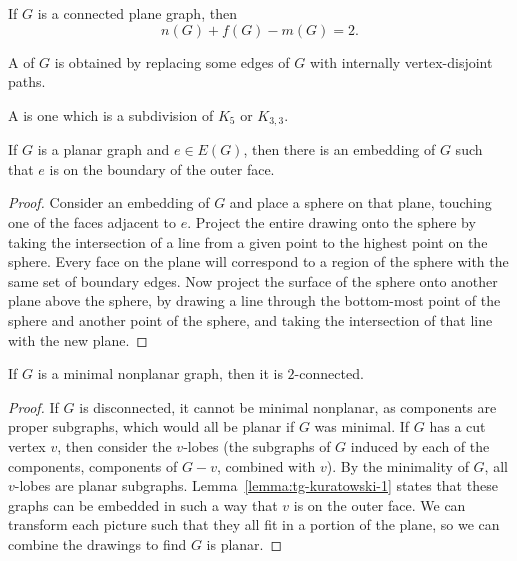 \begin{theorem}[Euler]
  If $G$ is a connected plane graph, then
  \[
	n(G) + f(G) - m(G) = 2.
  \]
\end{theorem}

\begin{definition}
  A  of $G$ is obtained by replacing some edges of $G$ with
  internally vertex-disjoint paths.
\end{definition}

\begin{definition}
  A  is one which is a subdivision of $K_5$ or
  $K_{3,3}$.
\end{definition}

\begin{lemma}
  \label{lemma:tg-kuratowski-1}
  If $G$ is a planar graph and $e \in E(G)$, then there is an embedding of $G$
  such that $e$ is on the boundary of the outer face.
\end{lemma}

\begin{proof}
  Consider an embedding of $G$ and place a sphere on that plane, touching one of
  the faces adjacent to $e$.
  Project the entire drawing onto the sphere by taking the intersection of a
  line from a given point to the highest point on the sphere.
  Every face on the plane will correspond to a region of the sphere with the
  same set of boundary edges.
  Now project the surface of the sphere onto another plane above the sphere, by
  drawing a line through the bottom-most point of the sphere and another point
  of the sphere, and taking the intersection of that line with the new plane.
\end{proof}

\begin{lemma}
  \label{lemma:tg-kuratowski-2}
  If $G$ is a minimal nonplanar graph, then it is $2$-connected.
\end{lemma}

\begin{proof}
  If $G$ is disconnected, it cannot be minimal nonplanar, as components are
  proper subgraphs, which would all be planar if $G$ was minimal.
  If $G$ has a cut vertex $v$, then consider the $v$-lobes (the subgraphs of $G$
  induced by each of the components, components of $G-v$, combined with $v$).
  By the minimality of $G$, all $v$-lobes are planar subgraphs.
  Lemma~\ref{lemma:tg-kuratowski-1} states that these graphs can be embedded in
  such a way that $v$ is on the outer face.
  We can transform each picture such that they all fit in a portion of the
  plane, so we can combine the drawings to find $G$ is planar.
\end{proof}

